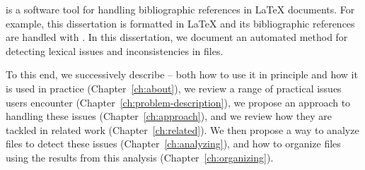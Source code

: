 
{\noindent}
{\bibtex} is a software tool for handling bibliographic
references in {\LaTeX} documents.  For example, this dissertation is
formatted in {\LaTeX} and its bibliographic references are handled
with {\bibtex}.  In this dissertation, we document an automated method for
detecting lexical issues and inconsistencies in {\bibtex} files.

To this end, we successively describe {\bibtex} -- both how to use it
in principle and how it is used in practice (Chapter~\ref{ch:about}),
we review a range of practical issues {\bibtex} users encounter
(Chapter~\ref{ch:problem-description}), we propose an approach to
handling these issues (Chapter~\ref{ch:approach}), and we review how
they are tackled in related work (Chapter~\ref{ch:related}).  We then
propose a way to analyze {\bibtex} files to detect these issues
(Chapter~\ref{ch:analyzing}), and how to organize {\bibtex} files
using the results from this analysis (Chapter~\ref{ch:organizing}).